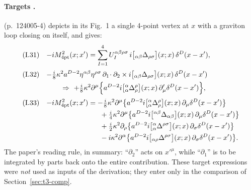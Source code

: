 \paragraph{Targets \tP.}
\PI{} (p.~124005-4) depicts in its Fig.~1 a single 4-point vertex at \(x\) with a
graviton loop closing on itself, and gives:
\begin{align*}
\text{(I.31)}\quad & {-i}M^2_{\rm 4pt}(x;x')=\sum_{I=1}^4U_I^{\alpha\beta\rho\sigma}\,
  i\bigl[{}_{\alpha\beta}\Delta_{\rho\sigma}\bigr](x;x)\,\delta^D(x-x'),\\[2pt]
\text{(I.32)}\quad & {-}\tfrac i8\kappa^2a^{D-2}\eta^{\alpha\beta}\eta^{\rho\sigma}\,
  \partial_1\!\cdot\partial_2\times i\bigl[{}_{\alpha\beta}\Delta_{\rho\sigma}\bigr](x;x)\,\delta^D(x-x')\\
 &\qquad\Rightarrow\ +\tfrac i8\kappa^2\partial^\mu\Bigl\{a^{D-2}i\bigl[{}^\alpha_\alpha\Delta^\rho_\rho\bigr](x;x)\,
  \partial'_\mu\delta^D(x-x')\Bigr\},\\[2pt]
\text{(I.33)}\quad & {-i}M^2_{\rm 4pt}(x;x')=-\tfrac i8\kappa^2\partial^\mu\bigl\{a^{D-2}i\bigl[{}^\alpha_\alpha\Delta^\rho_\rho\bigr](x;x)\,\partial_\mu\delta^D(x-x')\bigr\}\\
 &\hspace{7.6em}+\tfrac i4\kappa^2\partial^\mu\bigl\{a^{D-2}i\bigl[{}^{\alpha\beta}\Delta_{\alpha\beta}\bigr](x;x)\,\partial_\mu\delta^D(x-x')\bigr\}\\
 &\hspace{7.6em}+\tfrac i2\kappa^2\partial_\rho\bigl\{a^{D-2}i\bigl[{}^\alpha_\alpha\Delta^{\rho\sigma}\bigr](x;x)\,\partial_\sigma\delta^D(x-x')\bigr\}\\
 &\hspace{7.6em}-i\kappa^2\partial^\alpha\bigl\{a^{D-2}i\bigl[{}_{\alpha\rho}\Delta^{\rho\sigma}\bigr](x;x)\,\partial_\sigma\delta^D(x-x')\bigr\}.
\end{align*}
The paper's reading rule, in summary: ``\(\partial_2\)'' acts on \(x'^\mu\), while
``\(\partial_1\)'' is to be integrated by parts back onto the entire contribution.
These target expressions were \emph{not} used as inputs of the derivation; they enter
only in the comparison of Section~\ref{sec:t3-comp}.

